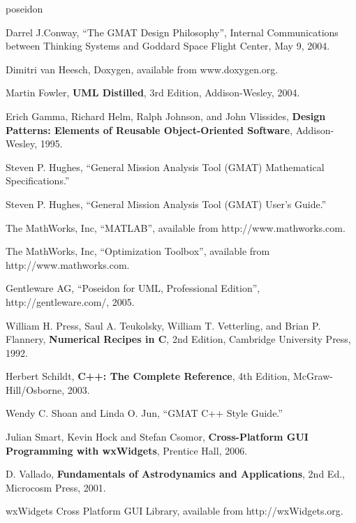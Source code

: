 \documentclass[letterpaper,10pt]{book}
\begin{document}
\begin{thebibliography}{poseidon} %

 Darrel J.Conway, ``The GMAT Design Philosophy'', Internal
Communications between Thinking Systems and Goddard Space Flight Center, May 9, 2004.

 Dimitri van Heesch, Doxygen, available from www.doxygen.org.

 Martin Fowler, \textbf{UML Distilled}, 3rd Edition, Addison-Wesley,
2004.

 Erich Gamma, Richard Helm, Ralph Johnson, and John Vlissides, \textbf{Design
Patterns: Elements of Reusable Object-Oriented Software}, Addison-Wesley, 1995.

 Steven P. Hughes, ``General Mission Analysis Tool (GMAT) Mathematical
Specifications.''

 Steven P. Hughes, ``General Mission Analysis Tool (GMAT) User's
Guide.''

 The MathWorks, Inc, ``MATLAB'', available from http://www.mathworks.com.

 The MathWorks, Inc, ``Optimization Toolbox'', available from
http://www.mathworks.com.

 Gentleware AG, ``Poseidon for UML, Professional Edition'',
http://gentleware.com/, 2005.

 William H. Press, Saul A. Teukolsky, William T. Vetterling, and Brian
P. Flannery, \textbf{Numerical Recipes in C}, 2nd Edition, Cambridge University Press, 1992.

 Herbert Schildt, \textbf{C++: The Complete Reference}, 4th Edition,
McGraw-Hill/Osborne, 2003.

 Wendy C. Shoan and Linda O. Jun, ``GMAT C++ Style Guide.''

 Julian Smart, Kevin Hock and Stefan Csomor, \textbf{Cross-Platform GUI
Programming with wxWidgets}, Prentice Hall, 2006.

D. Vallado, \textbf{Fundamentals of Astrodynamics and Applications},
2nd Ed., Microcosm Press, 2001.

 wxWidgets Cross Platform GUI Library, available from http://wxWidgets.org.

\end{thebibliography}

\printindex
\end{document}
